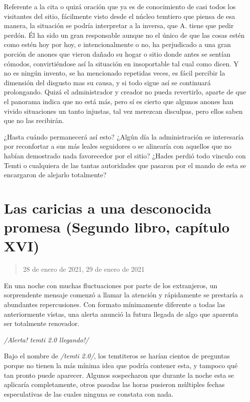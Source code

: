 \documentclass[
]{book}
\begin{document}
Referente a la cita o quizá oración que ya es de conocimiento de casi todos los visitantes del sitio, fácilmente visto desde el núcleo temtiero que piensa de esa manera, la situación se podría interpretar a la inversa, que A. tiene que pedir perdón. Él ha sido un gran responsable aunque no el único de que las cosas estén como estén hoy por hoy, e intencionalmente o no, ha perjudicado a una gran porción de anones que vieron dañado su hogar o sitio donde antes se sentían cómodos, convirtiéndose así la situación en insoportable tal cual como dicen. Y no es ningún invento, se ha mencionado repetidas veces, es fácil percibir la dimensión del disgusto mas su causa, y si todo sigue así se continuará prolongando. Quizá el administrador y creador no pueda revertirlo, aparte de que el panorama indica que no está más, pero sí es cierto que algunos anones han vivido situaciones un tanto injustas, tal vez merezcan disculpas, pero ellos saben que no las recibirán.

¿Hasta cuándo permanecerá así esto? ¿Algún día la administración se interesaría por reconfortar a sus más leales seguidores o se alinearía con aquellos que no habían demostrado nada favorecedor por el sitio? ¿Hades perdió todo vinculo con Temti o cualquiera de las tantas autoridades que pasaron por el mando de esta se encargaron de alejarlo totalmente?

\hypertarget{las-caricias-a-una-desconocida-promesa-segundo-libro-capuxedtulo-xvi}{%
\section{Las caricias a una desconocida promesa (Segundo libro, capítulo XVI)}\label{las-caricias-a-una-desconocida-promesa-segundo-libro-capuxedtulo-xvi}}

\begin{quote}
28 de enero de 2021, 29 de enero de 2021
\end{quote}

En una noche con muchas fluctuaciones por parte de los extranjeros, un sorprendente mensaje comenzó a llamar la atención y rápidamente se prestaría a abundantes repercusiones. Con formato mínimamente diferente a todas las anteriormente vistas, una alerta anunció la futura llegada de algo que aparenta ser totalmente renovador.

\emph{/Alerta! temti 2.0 llegando!/}

Bajo el nombre de \emph{/temti 2.0/}, los temtiteros se harían cientos de preguntas porque no tienen la más mínima idea que podría contener esta, y tampoco qué tan pronto puede aparecer. Algunos sospecharon que durante la noche esta se aplicaría completamente, otros pasadas las horas pusieron múltiples fechas especulativas de las cuales ninguna se constata con nada.
\end{document}
